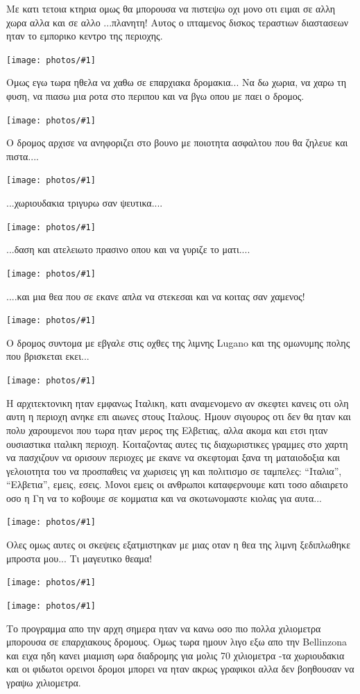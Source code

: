 \documentclass[11pt, letterpaper]{book}
\newcommand\photo[1]{\begin{center}\noindent\texttt{[image: photos/\#1]}\end{center}}
\begin{document}
Με κατι τετοια κτηρια ομως θα μπορουσα να πιστεψω οχι μονο οτι ειμαι σε αλλη χωρα αλλα και σε αλλο ...πλανητη! Αυτος ο ιπταμενος δισκος τεραστιων διαστασεων ηταν το εμπορικο κεντρο της περιοχης.

\photo{25.jpg}

Ομως εγω τωρα ηθελα να χαθω σε επαρχιακα δρομακια... 
Να δω χωρια, να χαρω τη φυση, να πιασω μια ροτα στο περιπου και να βγω οπου με παει ο δρομος.

\photo{26.jpg}

Ο δρομος αρχισε να ανηφοριζει στο βουνο με ποιοτητα ασφαλτου που θα ζηλευε και πιστα....

\photo{27.jpg}

...χωριουδακια τριγυρω σαν ψευτικα....

\photo{28.jpg}

...δαση και ατελειωτο πρασινο οπου και να γυριζε το ματι....

\photo{29.jpg}

....και μια θεα που σε εκανε απλα να στεκεσαι και να κοιτας σαν χαμενος!

\photo{30.jpg}

Ο δρομος συντομα με εβγαλε στις οχθες της λιμνης Lugano και της ομωνυμης πολης που βρισκεται εκει...

\photo{31.jpg}

Η αρχιτεκτονικη ηταν εμφανως Ιταλικη, κατι αναμενομενο αν σκεφτει κανεις οτι ολη αυτη η περιοχη ανηκε επι αιωνες στους Ιταλους. Ημουν σιγουρος οτι δεν θα ηταν και πολυ χαρουμενοι που τωρα ηταν μερος της Ελβετιας, αλλα ακομα και ετσι ηταν ουσιαστικα ιταλικη περιοχη. 
Κοιταζοντας αυτες τις διαχωριστικες γραμμες στο χαρτη να πασχιζουν να ορισουν περιοχες με εκανε να σκεφτομαι ξανα τη ματαιοδοξια και γελοιοτητα του να προσπαθεις να χωρισεις γη και πολιτισμο σε ταμπελες: ``Ιταλια'', ``Ελβετια'', εμεις, εσεις. Μονοι εμεις οι ανθρωποι καταφερνουμε κατι τοσο αδιαιρετο οσο η Γη να το κοβουμε σε κομματια και να σκοτωνομαστε κιολας για αυτα...

\photo{32.jpg}

Ολες ομως αυτες οι σκεψεις εξατμιστηκαν με μιας οταν η θεα της λιμνη ξεδιπλωθηκε μπροστα μου... 
Τι μαγευτικο θεαμα!

\photo{33.jpg}
\photo{34.jpg}

Το προγραμμα απο την αρχη σημερα ηταν να κανω οσο πιο πολλα χιλιομετρα μπορουσα σε επαρχιακους δρομους. 
Ομως τωρα ημουν λιγο εξω απο την Bellinzona και ειχα ηδη κανει μιαμιση ωρα διαδρομης για μολις 70 χιλιομετρα -τα χωριουδακια και οι φιδωτοι ορεινοι δρομοι μπορει να ηταν ακρως γραφικοι αλλα δεν βοηθουσαν να γραψω χιλιομετρα.
\end{document}
